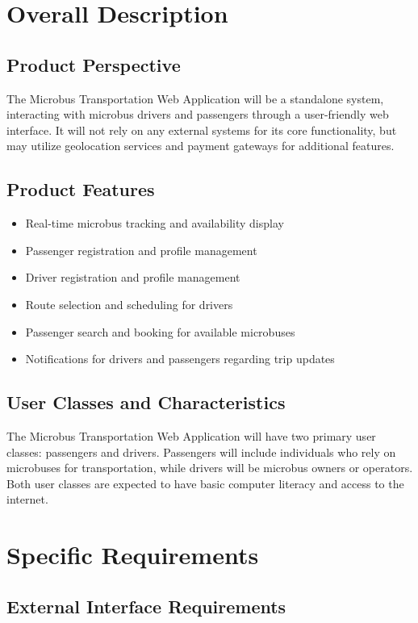 \documentclass{BusMateSRS}
\begin{document}
\chapter{Overall Description}
\section{Product Perspective}
The Microbus Transportation Web Application will be a standalone system, 
interacting with microbus drivers and passengers through a user-friendly 
web interface. It will not rely on any external systems for its core 
functionality, but may utilize geolocation services and payment gateways for 
additional features.

\section{Product Features}
\begin{itemize}
  \item Real-time microbus tracking and availability display
  \item Passenger registration and profile management
  \item Driver registration and profile management
  \item Route selection and scheduling for drivers
  \item Passenger search and booking for available microbuses
  \item Notifications for drivers and passengers regarding trip updates
\end{itemize}

\section{User Classes and Characteristics}
The Microbus Transportation Web Application will have two primary user classes: 
passengers and drivers. Passengers will include individuals who rely on 
microbuses for transportation, while drivers will be microbus owners or 
operators. 
Both user classes are expected to have basic computer literacy and 
access to the internet.


\chapter{Specific Requirements}
\section{External Interface Requirements}
\end{document}
